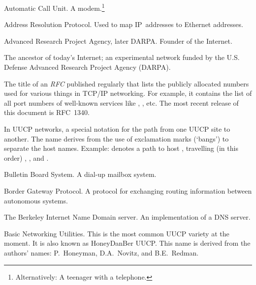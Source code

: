 \documentclass[11pt,makeidx]{report}
\def\emph#1{{\em{#1}}}
\begin{document}
{\newpage
\clearpage
\samepage \begin{dispitems}%
\ditem[ACU]
        Automatic Call Unit. A modem.\footnote{
         Alternatively: A teenager with a telephone.
        }

\ditem[ARP]
        Address Resolution Protocol. Used to map IP~addresses
        to Ethernet addresses.

\ditem[ARPA]
	Advanced Research Project Agency, later DARPA. Founder
	of the Internet.

\ditem[ARPANET]
	The ancestor of today's Internet; an experimental network
	funded by the U.S. Defense Advanced Research Project Agency
	(DARPA).

	The title of an \emph{RFC} published regularly that lists
	the publicly allocated numbers used for various things in
	TCP/IP networking. For example, it contains the list of all
	port numbers of well-known services like , 
	, etc. The most recent release of this
	document is RFC~1340.

	In UUCP networks, a special notation for the path from
	one UUCP site to another. The name derives from the
	use of exclamation marks (`bangs') to separate the
	host names. Example:  denotes
	a path to host , travelling (in this order)
	, , and .

\ditem[BBS]
	Bulletin Board System. A dial-up mailbox system.

\ditem[BGP]
	Border Gateway Protocol. A protocol for exchanging
	routing information between autonomous systems.

\ditem[BIND]
        The Berkeley Internet Name Domain server. An implementation
        of a DNS server.

\ditem[BNU]
	Basic Networking Utilities. This is the most common UUCP
	variety at the moment.  It is also known as HoneyDanBer UUCP.
	This name is derived from the authors' names: P.~Honeyman,
	D.A.~Novitz, and B.E.~Redman.


\end{dispitems}}
\end{document}
